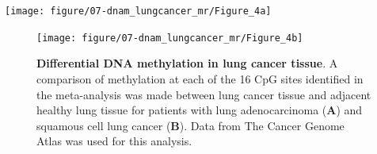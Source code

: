 \documentclass[11pt,oneside]{bristolthesis}
\begin{document}
\begin{center}\texttt{[image: figure/07-dnam\_lungcancer\_mr/Figure\_4a]} \end{center}
\begin{figure}

{\centering \texttt{[image: figure/07-dnam\_lungcancer\_mr/Figure\_4b]} 

}

\caption[Differential DNA methylation in lung cancer tissue]{\textbf{Differential DNA methylation in lung cancer tissue}. A comparison of methylation at each of the 16 CpG sites identified in the meta-analysis was made between lung cancer tissue and adjacent healthy lung tissue for patients with lung adenocarcinoma (\textbf{A}) and squamous cell lung cancer (\textbf{B}). Data from The Cancer Genome Atlas was used for this analysis.}\label{fig:fig4-07}
\end{figure}
\end{document}
